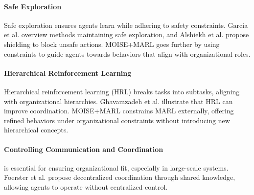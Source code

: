 \documentclass[sigconf,anonymous]{aamas}
\begin{document}
\paragraph{Safe Exploration}
Safe exploration ensures agents learn while adhering to safety constraints. Garcia et al. \cite{garcia2015comprehensive} overview methods maintaining safe exploration, and Alshiekh et al. \cite{alshiekh2018safe} propose shielding to block unsafe actions. MOISE+MARL goes further by using constraints to guide agents towards behaviors that align with organizational roles.

\paragraph{Hierarchical Reinforcement Learning}
Hierarchical reinforcement learning (HRL) breaks tasks into subtasks, aligning with organizational hierarchies. Ghavamzadeh et al. \cite{ghavamzadeh2006hrl} illustrate that HRL can improve coordination. MOISE+MARL constrains MARL externally, offering refined behaviors under organizational constraints without introducing new hierarchical concepts.

\paragraph{Controlling Communication and Coordination}
is essential for ensuring organizational fit, especially in large-scale systems. Foerster et al. \cite{foerster2018communication} propose decentralized coordination through shared knowledge, allowing agents to operate without centralized control.

\end{document}

